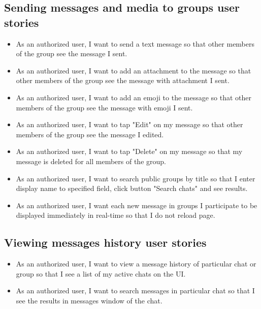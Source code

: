 \subsection{Sending messages and media to groups user stories}
\label{subsec:sending-messages-and-media-to-groups}
\begin{itemize}
    \item As an authorized user, I want to send a text message so that other members of the group see the message I sent.
    \item As an authorized user, I want to add an attachment to the message so that other members of the group see the
    message with attachment I sent.
    \item As an authorized user, I want to add an emoji to the message so that other members of the group see the message with emoji I sent.
    \item As an authorized user, I want to tap "Edit" on my message so that other members of the group see the message I edited.
    \item As an authorized user, I want to tap "Delete" on my message so that my message is deleted for all members of the group.
    \item As an authorized user, I want to search public groups by title so that I enter display name to specified field,
    click button "Search chats" and see results.
    \item As an authorized user, I want each new message in groups I participate to be displayed immediately in
    real-time so that I do not reload page.
\end{itemize}

\subsection{Viewing messages history user stories}\label{subsec:viewing-message-history-feature-user-stories}
\begin{itemize}
    \item As an authorized user, I want to view a message history of particular chat or group so that I see a list of
    my active chats on the UI\@.
    \item As an authorized user, I want to search messages in particular chat so that I see the results in messages
    window of the chat.
\end{itemize}


